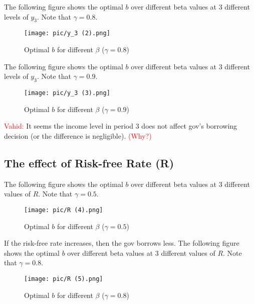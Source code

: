 \documentclass{article}
\begin{document}

The following figure shows the optimal $b$ over different beta values at 3 different levels of $y_3$. Note that $\gamma = 0.8$.

\begin{figure}[H]
\centering
{\texttt{[image: pic/y\_3 (2).png]}}
\caption{Optimal $b$ for different $\beta$ ($\gamma = 0.8$)}
\end{figure}

The following figure shows the optimal $b$ over different beta values at 3 different levels of $y_3$. Note that $\gamma = 0.9$.

\begin{figure}[H]
\centering
{\texttt{[image: pic/y\_3 (3).png]}}
\caption{Optimal $b$ for different $\beta$ ($\gamma = 0.9$)}
\end{figure}

\textcolor{red}{Vahid:} It seems the income level in period 3 does not affect gov's borrowing decision (or the difference is negligible). \textcolor{red}{(Why?)}

\subsection{The effect of Risk-free Rate (R)}

The following figure shows the optimal $b$ over different beta values at 3 different values of $R$. Note that $\gamma = 0.5$.

\begin{figure}[H]
\centering
{\texttt{[image: pic/R (4).png]}}
\caption{Optimal $b$ for different $\beta$ ($\gamma = 0.5$)}
\end{figure}

If the risk-free rate increases, then the gov borrows less. The following figure shows the optimal $b$ over different beta values at 3 different values of $R$. Note that $\gamma = 0.8$.

\begin{figure}[H]
\centering
{\texttt{[image: pic/R (5).png]}}
\caption{Optimal $b$ for different $\beta$ ($\gamma = 0.8$)}
\end{figure}
\end{document}

